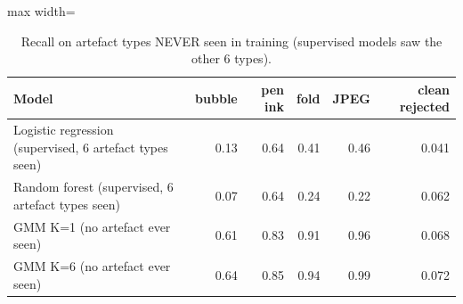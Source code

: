 \begin{table}[H]\centering\small
\caption{Recall on artefact types NEVER seen in training (supervised models saw the other 6 types).}\label{tab:unseen}
\begin{adjustbox}{max width=\linewidth}\begin{tabular}{p{7cm}rrrrr}\toprule
\textbf{Model} & \textbf{bubble} & \textbf{pen ink} & \textbf{fold} & \textbf{JPEG} & \textbf{clean rejected} \\\midrule
Logistic regression (supervised, 6 artefact types seen) & 0.13 & 0.64 & 0.41 & 0.46 & 0.041 \\
Random forest (supervised, 6 artefact types seen) & 0.07 & 0.64 & 0.24 & 0.22 & 0.062 \\
GMM K=1 (no artefact ever seen) & 0.61 & 0.83 & 0.91 & 0.96 & 0.068 \\
GMM K=6 (no artefact ever seen) & 0.64 & 0.85 & 0.94 & 0.99 & 0.072 \\
\bottomrule\end{tabular}\end{adjustbox}\end{table}